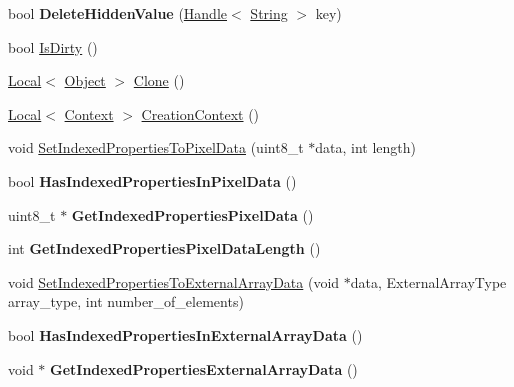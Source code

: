 \begin{DoxyCompactItemize}
\item 
\hypertarget{classv8_1_1Object_ab1d274da1949b1f68087728760ee4172}{bool {\bfseries Delete\-Hidden\-Value} (\hyperlink{classv8_1_1Handle}{Handle}$<$ \hyperlink{classv8_1_1String}{String} $>$ key)}\label{classv8_1_1Object_ab1d274da1949b1f68087728760ee4172}

\item 
bool \hyperlink{classv8_1_1Object_a3c1f8cfb754b5d29d5f1998b2047befd}{Is\-Dirty} ()
\item 
\hyperlink{classv8_1_1Local}{Local}$<$ \hyperlink{classv8_1_1Object}{Object} $>$ \hyperlink{classv8_1_1Object_a5018c9d085aa71f65530cf1e073a04ad}{Clone} ()
\item 
\hyperlink{classv8_1_1Local}{Local}$<$ \hyperlink{classv8_1_1Context}{Context} $>$ \hyperlink{classv8_1_1Object_af6966283a7d7e20779961eed434db04d}{Creation\-Context} ()
\item 
void \hyperlink{classv8_1_1Object_a6c552c4817b9a0eff1fb12b7ef089026}{Set\-Indexed\-Properties\-To\-Pixel\-Data} (uint8\-\_\-t $\ast$data, int length)
\item 
\hypertarget{classv8_1_1Object_a984cb47ed59b73d3d1b32f393a653cd4}{bool {\bfseries Has\-Indexed\-Properties\-In\-Pixel\-Data} ()}\label{classv8_1_1Object_a984cb47ed59b73d3d1b32f393a653cd4}

\item 
\hypertarget{classv8_1_1Object_af2cefd0bcc50b19bb23b93b493ceb3d2}{uint8\-\_\-t $\ast$ {\bfseries Get\-Indexed\-Properties\-Pixel\-Data} ()}\label{classv8_1_1Object_af2cefd0bcc50b19bb23b93b493ceb3d2}

\item 
\hypertarget{classv8_1_1Object_ac6af430db5a41a0c9b6cacb507d95e0d}{int {\bfseries Get\-Indexed\-Properties\-Pixel\-Data\-Length} ()}\label{classv8_1_1Object_ac6af430db5a41a0c9b6cacb507d95e0d}

\item 
void \hyperlink{classv8_1_1Object_a530f661dec20ce1a0a1b15a45195418c}{Set\-Indexed\-Properties\-To\-External\-Array\-Data} (void $\ast$data, External\-Array\-Type array\-\_\-type, int number\-\_\-of\-\_\-elements)
\item 
\hypertarget{classv8_1_1Object_ae3c884315aaba6d11d3663a8569fe8f1}{bool {\bfseries Has\-Indexed\-Properties\-In\-External\-Array\-Data} ()}\label{classv8_1_1Object_ae3c884315aaba6d11d3663a8569fe8f1}

\item 
\hypertarget{classv8_1_1Object_a7763a639b0ec6d35f645d0d2facfd8ce}{void $\ast$ {\bfseries Get\-Indexed\-Properties\-External\-Array\-Data} ()}\label{classv8_1_1Object_a7763a639b0ec6d35f645d0d2facfd8ce}


\end{DoxyCompactItemize}
